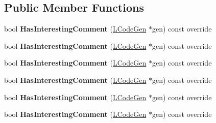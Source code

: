 \subsection*{Public Member Functions}
\begin{DoxyCompactItemize}
\item 
bool {\bfseries Has\+Interesting\+Comment} (\hyperlink{classv8_1_1internal_1_1_l_code_gen}{L\+Code\+Gen} $\ast$gen) const  override\hypertarget{classv8_1_1internal_1_1_l_unknown_o_s_r_value_a7bfc1db9b888b5300f258abf014a6860}{}\label{classv8_1_1internal_1_1_l_unknown_o_s_r_value_a7bfc1db9b888b5300f258abf014a6860}

\item 
bool {\bfseries Has\+Interesting\+Comment} (\hyperlink{classv8_1_1internal_1_1_l_code_gen}{L\+Code\+Gen} $\ast$gen) const  override\hypertarget{classv8_1_1internal_1_1_l_unknown_o_s_r_value_a7bfc1db9b888b5300f258abf014a6860}{}\label{classv8_1_1internal_1_1_l_unknown_o_s_r_value_a7bfc1db9b888b5300f258abf014a6860}

\item 
bool {\bfseries Has\+Interesting\+Comment} (\hyperlink{classv8_1_1internal_1_1_l_code_gen}{L\+Code\+Gen} $\ast$gen) const  override\hypertarget{classv8_1_1internal_1_1_l_unknown_o_s_r_value_a7bfc1db9b888b5300f258abf014a6860}{}\label{classv8_1_1internal_1_1_l_unknown_o_s_r_value_a7bfc1db9b888b5300f258abf014a6860}

\item 
bool {\bfseries Has\+Interesting\+Comment} (\hyperlink{classv8_1_1internal_1_1_l_code_gen}{L\+Code\+Gen} $\ast$gen) const  override\hypertarget{classv8_1_1internal_1_1_l_unknown_o_s_r_value_a7bfc1db9b888b5300f258abf014a6860}{}\label{classv8_1_1internal_1_1_l_unknown_o_s_r_value_a7bfc1db9b888b5300f258abf014a6860}

\item 
bool {\bfseries Has\+Interesting\+Comment} (\hyperlink{classv8_1_1internal_1_1_l_code_gen}{L\+Code\+Gen} $\ast$gen) const  override\hypertarget{classv8_1_1internal_1_1_l_unknown_o_s_r_value_a7bfc1db9b888b5300f258abf014a6860}{}\label{classv8_1_1internal_1_1_l_unknown_o_s_r_value_a7bfc1db9b888b5300f258abf014a6860}

\item 
bool {\bfseries Has\+Interesting\+Comment} (\hyperlink{classv8_1_1internal_1_1_l_code_gen}{L\+Code\+Gen} $\ast$gen) const  override\hypertarget{classv8_1_1internal_1_1_l_unknown_o_s_r_value_a7bfc1db9b888b5300f258abf014a6860}{}\label{classv8_1_1internal_1_1_l_unknown_o_s_r_value_a7bfc1db9b888b5300f258abf014a6860}


\end{DoxyCompactItemize}
